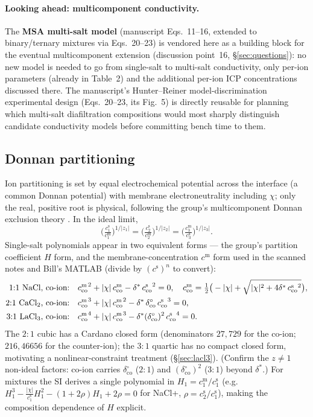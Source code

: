 \documentclass[11pt]{article}
\newcommand{\note}[1]{{\color{blue}\textsf{(#1)}}}
\newcommand{\cm}[1]{{c^{\mathrm{m}}_{#1}}}
\newcommand{\cs}[1]{{c^{\mathrm{s}}_{#1}}}
\newcommand{\co}{\mathrm{co}}
\newcommand{\dstar}{\delta^{*}}
\begin{document}
\paragraph{Looking ahead: multicomponent conductivity.} The \textbf{MSA
multi-salt model} (manuscript Eqs.~11--16, extended to binary/ternary mixtures
via Eqs.~20--23) is vendored here as a building block for the eventual
multicomponent extension (discussion point~16, \S\ref{sec:questions}): no
new model is needed to go from single-salt to multi-salt conductivity, only
per-ion parameters (already in Table~2) and the additional per-ion ICP
concentrations discussed there. The manuscript's Hunter--Reiner
model-discrimination experimental design (Eqs.~20--23, its Fig.~5) is directly
reusable for planning which multi-salt diafiltration compositions would most
sharply distinguish candidate conductivity models before committing bench time
to them.

\subsection{Donnan partitioning}\label{sec:donnan}
Ion partitioning is set by equal electrochemical potential across the interface
(a common Donnan potential) with membrane electroneutrality including $\chi$; only
the real, positive root is physical, following the group's multicomponent Donnan
exclusion theory \cite{multicompDonnanTheory}. In the ideal limit,
\begin{equation}
  \Big(\tfrac{\cs{1}}{\cm{1}}\Big)^{1/|z_1|}
  =\Big(\tfrac{\cs{2}}{\cm{2}}\Big)^{1/|z_2|}
  =\Big(\tfrac{\cm{3}}{\cs{3}}\Big)^{1/|z_3|}.
  \label{eq:donnaneq}
\end{equation}
Single-salt polynomials appear in two equivalent forms --- the group's partition
coefficient $H$ form, and the membrane-concentration $\cm{}$ form used in the
scanned notes \cite{donnan11notes,donnan21notes,donnan31notes} and Bill's MATLAB
\cite{billmatlab} (divide by $(\cs{})^n$ to convert):
\begin{align}
  \text{$1{:}1$ NaCl, co-ion:}\quad
    &\cm{\co}^2 + |\chi|\,\cm{\co} - \dstar\,\cs{\co}^2 = 0,
    \quad \cm{\co} = \tfrac12\big(-|\chi| + \sqrt{|\chi|^2 + 4\dstar\,\cs{\co}^2}\big),
    \label{eq:11co}\\
  \text{$2{:}1$ \ce{CaCl2}, co-ion:}\quad
    &\cm{\co}^3 + |\chi|\,\cm{\co}^2 - \dstar\,\delta^{\circ}_{\co}\,\cs{\co}^3 = 0,
    \label{eq:21co}\\
  \text{$3{:}1$ \ce{LaCl3}, co-ion:}\quad
    &\cm{\co}^4 + |\chi|\,\cm{\co}^3 - \dstar(\delta^{\circ}_{\co})^2\,\cs{\co}^4 = 0.
    \label{eq:31co}
\end{align}
The $2{:}1$ cubic has a Cardano closed form (denominators $27,729$ for the
co-ion; $216,46656$ for the counter-ion); the $3{:}1$ quartic has no compact
closed form, motivating a nonlinear-constraint treatment (\S\ref{sec:lacl3}).
\note{Confirm the $z\ne1$ non-ideal factors: co-ion carries $\delta^{\circ}_{\co}$
($2{:}1$) and $(\delta^{\circ}_{\co})^2$ ($3{:}1$) beyond $\dstar$.} For mixtures
the SI \cite{siDocx} derives a single polynomial in $H_1=\cm{1}/\cs{1}$ (e.g.\
$H_1^3-\tfrac{|\chi|}{\cs{1}}H_1^2-(1+2\rho)H_1+2\rho=0$ for NaCl+,
$\rho=\cs{2}/\cs{1}$), making the composition dependence of $H$ explicit.
\end{document}
